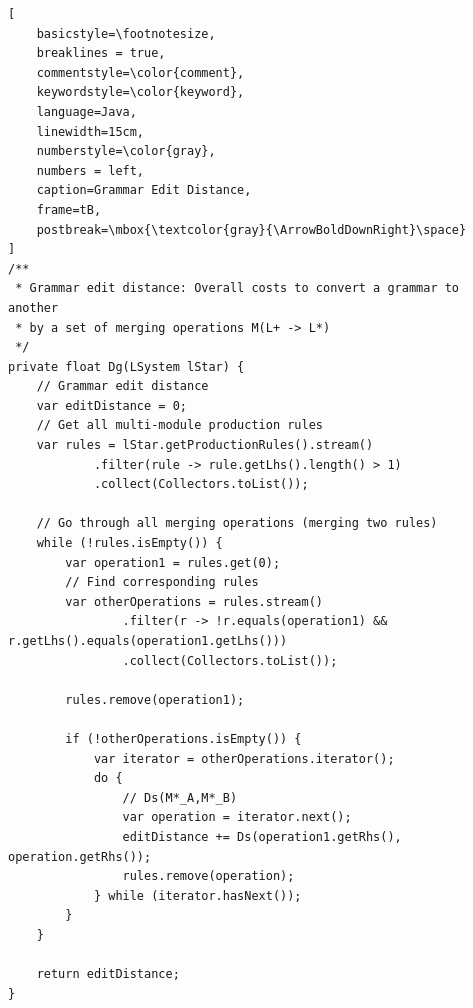 \begin{lstlisting}[
    basicstyle=\footnotesize,
    breaklines = true,
    commentstyle=\color{comment},
    keywordstyle=\color{keyword},
    language=Java,
    linewidth=15cm,
    numberstyle=\color{gray},
    numbers = left,
    caption=Grammar Edit Distance,
    frame=tB,
    postbreak=\mbox{\textcolor{gray}{\ArrowBoldDownRight}\space}
]
/**
 * Grammar edit distance: Overall costs to convert a grammar to another
 * by a set of merging operations M(L+ -> L*)
 */
private float Dg(LSystem lStar) {
    // Grammar edit distance
    var editDistance = 0;
    // Get all multi-module production rules
    var rules = lStar.getProductionRules().stream()
            .filter(rule -> rule.getLhs().length() > 1)
            .collect(Collectors.toList());

    // Go through all merging operations (merging two rules)
    while (!rules.isEmpty()) {
        var operation1 = rules.get(0);
        // Find corresponding rules
        var otherOperations = rules.stream()
                .filter(r -> !r.equals(operation1) && r.getLhs().equals(operation1.getLhs()))
                .collect(Collectors.toList());

        rules.remove(operation1);

        if (!otherOperations.isEmpty()) {
            var iterator = otherOperations.iterator();
            do {
                // Ds(M*_A,M*_B)
                var operation = iterator.next();
                editDistance += Ds(operation1.getRhs(), operation.getRhs());
                rules.remove(operation);
            } while (iterator.hasNext());
        }
    }

    return editDistance;
}
\end{lstlisting}

\newpage

